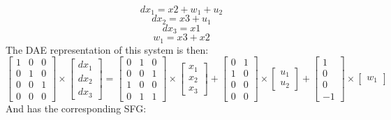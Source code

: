 \begin{equation}
dx_1=x2+w_1+u_2
\end{equation}
\begin{equation}
dx_2=x3+u_1
\end{equation}
\begin{equation}
dx_3=x1
\end{equation}
\begin{equation}
w_1=x3+x2
\end{equation}\newline The DAE representation of this system is then:\\\newline
$
\begin{bmatrix}  1 & 0 & 0 \\ 0 & 1 & 0  \\ 0 & 0 & 1 \\ 0 & 0 & 0   \end{bmatrix} \times \left[ \begin{array}{c} dx_1 \\ dx_2 \\ dx_3 \end{array} \right]
= \begin{bmatrix} 0 & 1 & 0 \\ 0 & 0 & 1 \\ 1 & 0 & 0 \\ 0 & 1 & 1 \end{bmatrix} \times \left[ \begin{array}{c} x_1 \\ x_2 \\ x_3 \end{array} \right] + \begin{bmatrix} 0 & 1 \\ 1 & 0 \\ 0 & 0 \\ 0 & 0 \end{bmatrix} \times \left[ \begin{array}{c} u_1 \\ u_2 \end{array} \right]+
\begin{bmatrix} 1 \\ 0 \\ 0  \\ -1 \end{bmatrix} \times \left[ \begin{array}{c} w_1 \end{array} \right]$\newline
And has the corresponding SFG:\newline
